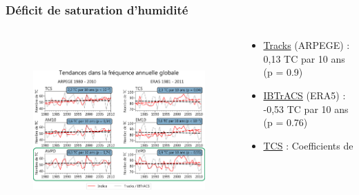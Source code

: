 \documentclass[aspectratio=169, usepdftitle=false, xcolor={dvipsnames}, 9pt,table]{beamer}
\begin{document}
\begin{frame}[t]
    \frametitle{Déficit de saturation d'humidité}
    \begin{columns}
        \begin{column}{0.7\textwidth}
            \vspace{-1.5em}
            \begin{figure}
                \centering
                \includegraphics[height=7cm]{Figures/trends.png}
            \end{figure}
        \end{column}
        \begin{column}{0.3\textwidth}
            \scriptsize
            \vspace{-1em}
            \begin{block}[Références]
                \setlength{\leftmargini}{2.5ex}
                \begin{itemize}
                   \item \underline{Tracks} (ARPEGE) :\\
                       0,13 TC par 10 ans (p = 0.9) 
                   \item \underline{IBTrACS} (ERA5) :\\
                        -0,53 TC par 10 ans (p = 0.76)
                \end{itemize}
            \end{block}
            \vspace{1em}
            \begin{examples}[Indices]
                \setlength{\leftmargini}{2.5ex}
                \begin{itemize}
                    \item \underline{TCS} : Coefficients de \cite{tippett_poisson_2011}

\end{itemize}
\end{examples}
\end{column}
\end{columns}
\end{frame}
\end{document}
